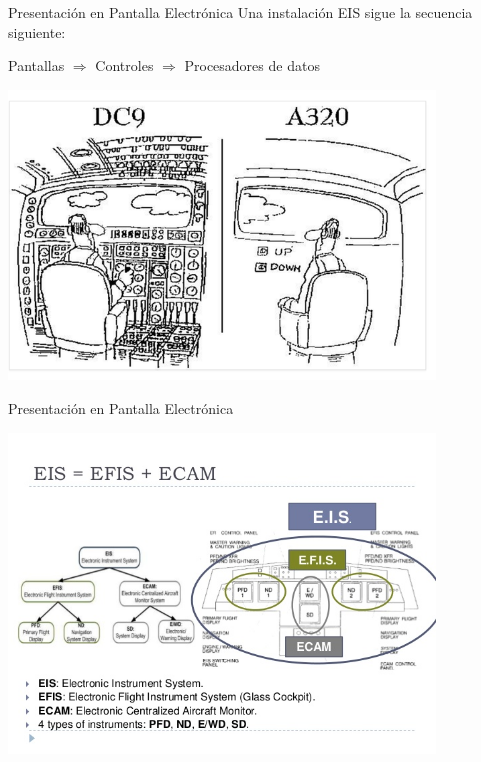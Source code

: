 \documentclass[10pt]{beamer}
\begin{document}
\begin{frame}{Presentaci\'on en Pantalla Electr\'onica}
  Una instalaci\'on EIS sigue la secuencia siguiente:

\vspace{3mm}


 Pantallas \qquad $\Longrightarrow$ \qquad
 Controles  \qquad $\Longrightarrow$ \qquad
 Procesadores de datos 


\includegraphics[width=0.85\textwidth]{imagenes/1.4.pantalla.electronica/efis_humor.png}


\end{frame}

\begin{frame}{Presentaci\'on en Pantalla Electr\'onica}

\includegraphics[width=0.85\textwidth]{imagenes/1.4.pantalla.electronica/efis.jpg}

\end{frame}
\end{document}
